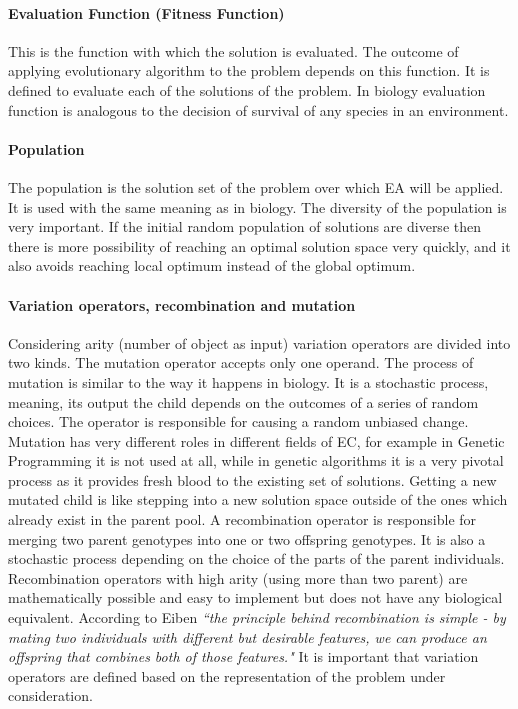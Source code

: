 \paragraph{Evaluation Function (Fitness Function)}
This is the function with which the solution is evaluated. The outcome of applying evolutionary algorithm to the problem depends on this function. It is defined to evaluate each of the solutions of the problem. In biology evaluation function is analogous to the decision of survival of any species in an environment. 

\paragraph{Population}
The population is the solution set of the problem over which EA will be applied. It is used with the same meaning as in biology. The diversity of the population is very important. If the initial random population of solutions are diverse then there is more possibility of reaching an optimal solution space very quickly, and it also avoids reaching local optimum instead of the global optimum.

\paragraph{Variation operators, recombination and mutation}
Considering arity (number of object as input) variation operators are divided into two kinds. The mutation operator accepts only one operand. The process of mutation is similar to the way it happens in biology. It is a stochastic process, meaning, its output the child depends on the outcomes of a series of random choices. The operator is responsible for causing a random unbiased change. Mutation has very different roles in different fields of EC, for example in Genetic Programming it is not used at all, while in genetic algorithms it is a very pivotal process as it provides fresh blood to the existing set of solutions. Getting a new mutated child is like stepping into a new solution space outside of the ones which already exist in the parent pool. A recombination operator is responsible for merging two parent genotypes into one or two offspring genotypes. It is also a stochastic process depending on the choice of the parts of the parent individuals. Recombination operators with high arity (using more than two parent) are mathematically possible and easy to implement but does not have any biological equivalent. According to Eiben \cite{eiben2003} \textsl{``the principle behind recombination is simple - by mating two individuals with different but desirable features, we can produce an offspring that combines both of those features."} It is important that variation operators are defined based on the representation of the problem under consideration. 


